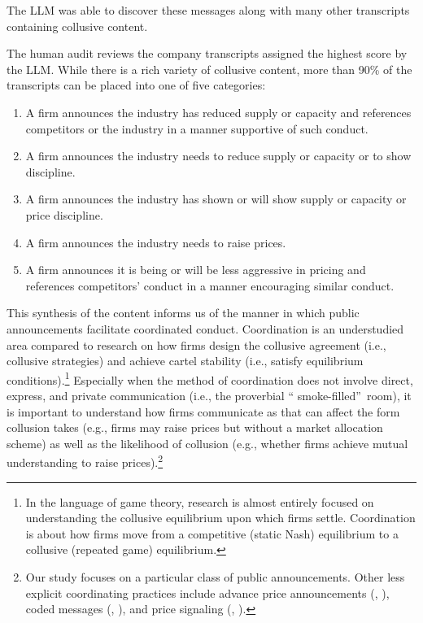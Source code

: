 \noindent The LLM was able to discover these messages along with many other
transcripts containing collusive content.

The human audit reviews the  company transcripts assigned the
highest score by the LLM. While there is a rich variety of collusive content,
more than 90\% of the transcripts can be placed into one of five categories:

\begin{enumerate}
\item A firm announces the industry has reduced supply or capacity and references competitors
or the industry in a manner supportive of such conduct.

\item A firm announces the industry needs to reduce supply or capacity or to show discipline.

\item A firm announces the industry has shown or will show supply or capacity or price
discipline.

\item A firm announces the industry needs to raise prices.

\item A firm announces it is being or will be less aggressive in pricing and references
competitors' conduct in a manner encouraging similar conduct.
\end{enumerate}

This synthesis of the content informs us of the manner in which public announcements facilitate coordinated conduct.
Coordination is an understudied area compared to research on how firms design the collusive
agreement (i.e., collusive strategies) and achieve cartel stability (i.e.,
satisfy equilibrium conditions).\footnote{%
In the language of game theory, research is almost entirely focused on
understanding the collusive equilibrium upon which firms settle.
Coordination is about how firms move from a competitive (static Nash)
equilibrium to a collusive (repeated game) equilibrium.} Especially when the
method of coordination does not involve direct, express, and private
communication (i.e., the proverbial \textquotedblleft
smoke-filled\textquotedblright\ room), it is important to understand how
firms communicate as that can affect the form collusion takes (e.g., firms
may raise prices but without a market allocation scheme) as well as the
likelihood of collusion (e.g., whether firms achieve mutual understanding to
raise prices).\footnote{%
Our study focuses on a particular class of public announcements. Other less
explicit coordinating practices include advance price announcements
(\textcite{borenstein2004rapid}, \textcite{chen2017preannouncements}), coded
messages (\textcite{cramton2000collusive}, \textcite{harrington2025nonexpress}),
and price signaling (\textcite{byrne2019learning}, \textcite{byrne2025platforms}).}

